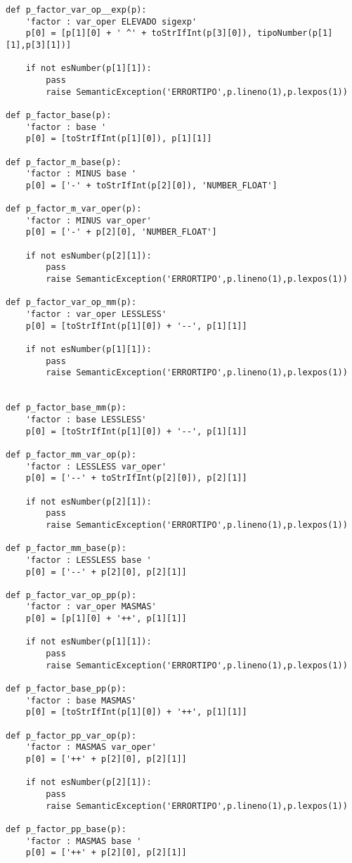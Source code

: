 \begin{verbatim}
def p_factor_var_op__exp(p):
    'factor : var_oper ELEVADO sigexp'
    p[0] = [p[1][0] + ' ^' + toStrIfInt(p[3][0]), tipoNumber(p[1][1],p[3][1])]

    if not esNumber(p[1][1]):
        pass
        raise SemanticException('ERRORTIPO',p.lineno(1),p.lexpos(1))

def p_factor_base(p):
    'factor : base '
    p[0] = [toStrIfInt(p[1][0]), p[1][1]]

def p_factor_m_base(p):
    'factor : MINUS base '
    p[0] = ['-' + toStrIfInt(p[2][0]), 'NUMBER_FLOAT']

def p_factor_m_var_oper(p):
    'factor : MINUS var_oper'
    p[0] = ['-' + p[2][0], 'NUMBER_FLOAT']

    if not esNumber(p[2][1]):
        pass
        raise SemanticException('ERRORTIPO',p.lineno(1),p.lexpos(1))

def p_factor_var_op_mm(p):
    'factor : var_oper LESSLESS'
    p[0] = [toStrIfInt(p[1][0]) + '--', p[1][1]]

    if not esNumber(p[1][1]):
        pass
        raise SemanticException('ERRORTIPO',p.lineno(1),p.lexpos(1))

        
def p_factor_base_mm(p):
    'factor : base LESSLESS'
    p[0] = [toStrIfInt(p[1][0]) + '--', p[1][1]]

def p_factor_mm_var_op(p):
    'factor : LESSLESS var_oper'
    p[0] = ['--' + toStrIfInt(p[2][0]), p[2][1]]

    if not esNumber(p[2][1]):
        pass
        raise SemanticException('ERRORTIPO',p.lineno(1),p.lexpos(1))

def p_factor_mm_base(p):
    'factor : LESSLESS base '
    p[0] = ['--' + p[2][0], p[2][1]]

def p_factor_var_op_pp(p):
    'factor : var_oper MASMAS'
    p[0] = [p[1][0] + '++', p[1][1]]

    if not esNumber(p[1][1]):
        pass
        raise SemanticException('ERRORTIPO',p.lineno(1),p.lexpos(1))

def p_factor_base_pp(p):
    'factor : base MASMAS'
    p[0] = [toStrIfInt(p[1][0]) + '++', p[1][1]]

def p_factor_pp_var_op(p):
    'factor : MASMAS var_oper'
    p[0] = ['++' + p[2][0], p[2][1]]

    if not esNumber(p[2][1]):
        pass
        raise SemanticException('ERRORTIPO',p.lineno(1),p.lexpos(1))

def p_factor_pp_base(p):
    'factor : MASMAS base '
    p[0] = ['++' + p[2][0], p[2][1]]


\end{verbatim}
